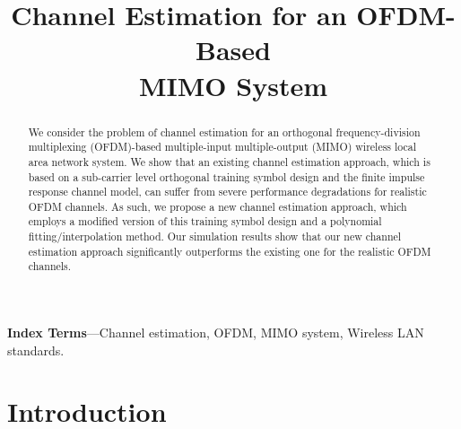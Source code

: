 \documentclass[11pt,draftnofoot,onecolumn]{IEEEtran}
\def\spacingset#1{\def\baselinestretch{#1}\small\normalsize}
\begin{document}
\spacingset{1.18}


\title{Channel Estimation for an OFDM-Based\\
MIMO System}
%
\author{
\and {}
%
}
%
%
\maketitle%
%

\begin{abstract}%
We consider the problem of channel estimation for an orthogonal
frequency-division multiplexing (OFDM)-based multiple-input
multiple-output (MIMO) wireless local area network system. We show
that an existing channel estimation approach, which is based on a
sub-carrier level orthogonal training symbol design and the finite
impulse response channel model, can suffer from severe performance
degradations for realistic OFDM channels. As such, we propose a new
channel estimation approach, which employs a modified version of
this training symbol design and a polynomial fitting/interpolation
method. Our simulation results show that our new channel estimation
approach significantly outperforms the existing one for the
realistic OFDM channels.
\end{abstract}

\vspace{0.2cm}

{\bf Index Terms}---Channel estimation, OFDM, MIMO system, Wireless
LAN standards.


\section{Introduction}
\label{sec1}
\end{document}
